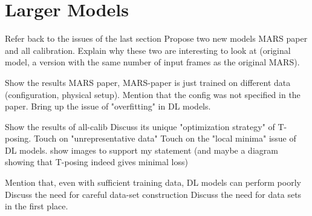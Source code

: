 \section{Larger Models}
\label{section: evaluation - larger models}

Refer back to the issues of the last section
Propose two new models
MARS paper and all calibration.
Explain why these two are interesting to look at (original model, a version with the same number of input frames as the original MARS).

Show the results MARS paper, 
MARS-paper is just trained on different data (configuration, physical setup).
Mention that the config was not specified in the paper.
Bring up the issue of "overfitting" in DL models.

Show the results of all-calib
Discuss its unique "optimization strategy" of T-posing.
Touch on "unrepresentative data"
Touch on the "local minima" issue of DL models.
show images to support my statement (and maybe a diagram showing that T-posing indeed gives minimal loss)

Mention that, even with sufficient training data, DL models can perform poorly
Discuss the need for careful data-set construction
Discuss the need for data sets in the first place.




